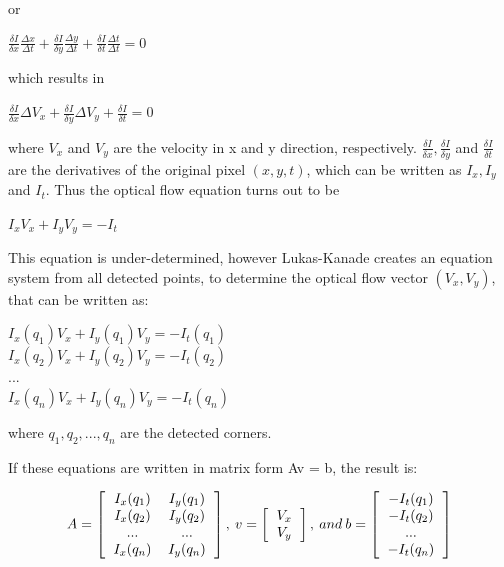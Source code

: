 or

\begin{center}
\large
$\frac{\delta I}{\delta x}\frac{\Delta x}{\Delta t} + \frac{\delta I}{\delta y}\frac{\Delta y}{\Delta t} + \frac{\delta I}{\delta t}\frac{\Delta t}{\Delta t} = 0$
\normalsize
\end{center}

which results in 

\begin{center}
\large
$\frac{\delta I}{\delta x}\Delta V_x + \frac{\delta I}{\delta y}\Delta V_y + \frac{\delta I}{\delta t} = 0$
\normalsize
\end{center}

where $V_x$ and $V_y$ are the velocity in x and y direction, respectively. $\frac{\delta I}{\delta x}, \frac{\delta I}{\delta y}$ and $\frac{\delta I}{\delta t}$ are the derivatives of the original pixel $(x, y, t)$, which can be written as $I_x, I_y$ and $I_t$.
Thus the optical flow equation turns out to be

\begin{center}
\large
$I_x V_x + I_y V_y = -I_t$
\normalsize
\end{center}

This equation is under-determined, however Lukas-Kanade creates an equation system from all detected points, to determine the optical flow vector $(V_x, V_y)$, that can be written as: 

\begin{center}
\large
$I_x(q_1) V_x + I_y(q_1) V_y = -I_t(q_1)$\\
$I_x(q_2) V_x + I_y(q_2) V_y = -I_t(q_2)$\\
...\\
$I_x(q_n) V_x + I_y(q_n) V_y = -I_t(q_n)$
\normalsize
\end{center}

where $q_1, q_2, ..., q_n$ are the detected corners.

If these equations are written in matrix form Av = b, the result is: 

\[ 
A=
\left[
  \begin{tabular}{cc}
  $I_x(q_1)$ & $I_y(q_1)$ \\
  $I_x(q_2)$ & $I_y(q_2)$ \\
  ... & ... \\
  $I_x(q_n)$ & $I_y(q_n)$ \\
  \end{tabular}
\right],\:
v =
\left[
	\begin{tabular}{c}
	$V_x$\\
	$V_y$
	\end{tabular}
\right],\:
and\: b = 
\left[
	\begin{tabular}{c}
	$-I_t(q_1)$\\
	$-I_t(q_2)$\\
	...\\
	$-I_t(q_n)$\\
	\end{tabular}
\right]
\]

